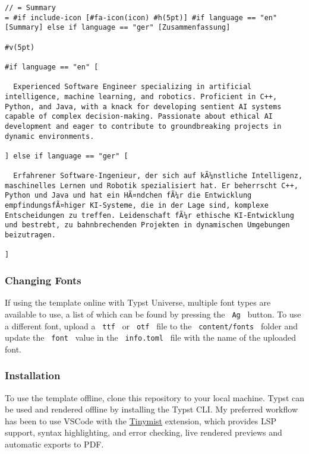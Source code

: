 \begin{verbatim}
// = Summary
= #if include-icon [#fa-icon(icon) #h(5pt)] #if language == "en" [Summary] else if language == "ger" [Zusammenfassung]

#v(5pt)

#if language == "en" [

  Experienced Software Engineer specializing in artificial intelligence, machine learning, and robotics. Proficient in C++, Python, and Java, with a knack for developing sentient AI systems capable of complex decision-making. Passionate about ethical AI development and eager to contribute to groundbreaking projects in dynamic environments.

] else if language == "ger" [

  Erfahrener Software-Ingenieur, der sich auf kÃ¼nstliche Intelligenz, maschinelles Lernen und Robotik spezialisiert hat. Er beherrscht C++, Python und Java und hat ein HÃ¤ndchen fÃ¼r die Entwicklung empfindungsfÃ¤higer KI-Systeme, die in der Lage sind, komplexe Entscheidungen zu treffen. Leidenschaft fÃ¼r ethische KI-Entwicklung und bestrebt, zu bahnbrechenden Projekten in dynamischen Umgebungen beizutragen.

]
\end{verbatim}

\subsubsection{Changing Fonts}\label{changing-fonts}

If using the template online with Typst Universe, multiple font types
are available to use, a list of which can be found by pressing the
\texttt{\ Ag\ } button. To use a different font, upload a
\texttt{\ ttf\ } or \texttt{\ otf\ } file to the
\texttt{\ content/fonts\ } folder and update the \texttt{\ font\ } value
in the \texttt{\ info.toml\ } file with the name of the uploaded font.

\subsubsection{Installation}\label{installation}

To use the template offline, clone this repository to your local
machine. Typst can be used and rendered offline by installing the Typst
CLI. My preferred workflow has been to use VSCode with the
\href{https://github.com/Myriad-Dreamin/tinymist/releases}{Tinymist}
extension, which provides LSP support, syntax highlighting, and error
checking, live rendered previews and automatic exports to PDF.

